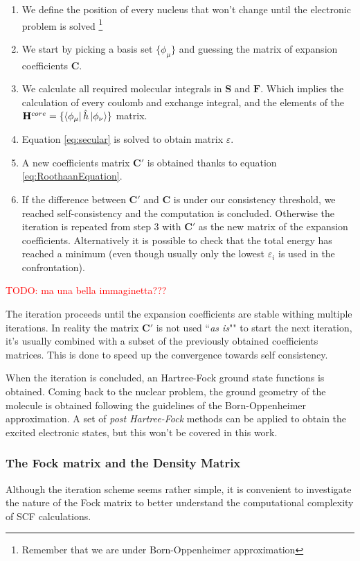 \documentclass[a4paper,12pt]{article}
\newcommand\mynotes[1]{\begin{flushright}

\textcolor{red}{TODO: #1}\end{flushright}}
\begin{document}
\begin{enumerate}
	\item We define the position of every nucleus that won't change until the electronic problem is solved \footnote{Remember that we are under Born-Oppenheimer approximation}
	\item We start by picking a basis set $\{\phi_{\mu}\}$ and guessing the matrix of expansion coefficients $\mathbf{C}$.
	\item We calculate all required molecular integrals in $\mathbf{S}$ and $\mathbf{F}$. Which implies the calculation of every coulomb and exchange integral, and the elements of the $\mathbf{H}^{core} = \{\bra{\phi_{\mu}}\hat{h}\ket{\phi_{\nu}}\}$ matrix.
	\item Equation \eqref{eq:secular} is solved to obtain matrix $\varepsilon$.
	\item A new coefficients matrix $\mathbf{C'}$ is obtained thanks to equation \eqref{eq:RoothaanEquation}.
	\item If the difference between $\mathbf{C'}$ and $\mathbf{C} $ is under our consistency threshold, we reached self-consistency and the computation is concluded. Otherwise the iteration is repeated from step 3 with $\mathbf{C'}$ as the new matrix of the expansion coefficients. Alternatively it is possible to check that the total energy has reached a minimum (even though usually only the lowest $\varepsilon_i$ is used in the confrontation).
\end{enumerate}

\mynotes{ma una bella immaginetta???}

The iteration proceeds until the expansion coefficients are stable withing multiple iterations. In reality the matrix $\mathbf{C'}$ is not used ``\textit{as is}"" to start the next iteration, it's usually combined with a subset of the previously obtained coefficients matrices. This is done to speed up the convergence towards self consistency.

When the iteration is concluded, an Hartree-Fock ground state functions is obtained. Coming back to the nuclear problem, the ground geometry of the molecule is obtained following the guidelines of the Born-Oppenheimer approximation.
A set of \textit{post Hartree-Fock} methods can be applied to obtain the excited electronic states, but this won't be covered in this work.

\subsubsection{The Fock matrix and the Density Matrix}
Although the iteration scheme seems rather simple, it is convenient to investigate the nature of the Fock matrix to better understand the computational complexity of SCF calculations.
\end{document}
